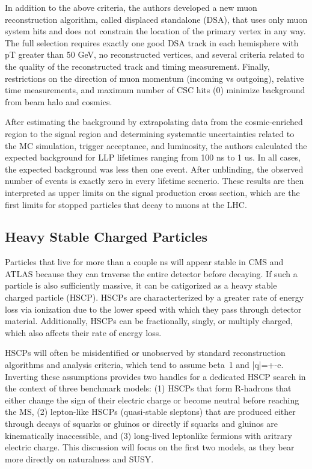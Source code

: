 \documentclass[12pt]{article}
\begin{document}
            In addition to the above criteria, the authors developed a new muon reconstruction algorithm, called displaced standalone (DSA), that uses only muon system hits and does not constrain the location of the primary vertex in any way. The full selection requires exactly one good DSA track in each hemisphere with pT greater than 50 GeV, no reconstructed vertices, and several criteria related to the quality of the reconstructed track and timing measurement. Finally, restrictions on the direction of muon momentum (incoming vs outgoing), relative time measurements, and maximum number of CSC hits (0) minimize background from beam halo and cosmics.

            After estimating the background by extrapolating data from the cosmic-enriched region to the signal region and determining systematic uncertainties related to the MC simulation, trigger acceptance, and luminosity, the authors calculated the expected background for LLP lifetimes ranging from 100 ns to 1 us. In all cases, the expected background was less then one event. After unblinding, the observed number of events is exactly zero in every lifetime scenerio. These results are then interpreted as upper limits on the signal production cross section, which are the first limits for stopped particles that decay to muons at the LHC.

\subsection{Heavy Stable Charged Particles}
            Particles that live for more than a couple ns will appear stable in CMS and ATLAS because they can traverse the entire detector before decaying. If such a particle is also sufficiently massive, it can be catigorized as a heavy stable charged particle (HSCP). HSCPs are characterterized by a greater rate of energy loss via ionization due to the lower speed with which they pass through detector material. Additionally, HSCPs can be fractionally, singly, or multiply charged, which also affects their rate of energy loss. 

            HSCPs will often be misidentified or unobserved by standard reconstruction algorithms and analysis criteria, which tend to assume beta~1 and |q|=+-e. Inverting these assumptions provides two handles for a dedicated HSCP search in the context of three benchmark models: (1) HSCPs that form R-hadrons that either change the sign of their electric charge or become neutral before reaching the MS, (2) lepton-like HSCPs (quasi-stable sleptons) that are produced either through decays of squarks or gluinos or directly if squarks and gluinos are kinematically inaccessible, and (3) long-lived leptonlike fermions with aritrary electric charge. This discussion will focus on the first two models, as they bear more directly on naturalness and SUSY.
\end{document}
